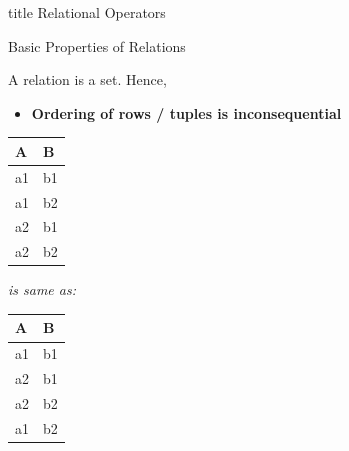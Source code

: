 \documentclass[aspectratio=169, xcolor=dvipsnames]{beamer}
\begin{document}
\begin{frame}
  \vfill
  \centering
  \begin{beamercolorbox}[sep=8pt,center,shadow=true,rounded=true]{title}
    Relational Operators\par%
  \end{beamercolorbox}
  \vfill
\end{frame}

\begin{frame}{Basic Properties of Relations}
    \begin{block}{A relation is a set. Hence,}
        \begin{itemize}[<+->]
            \item \textbf{Ordering of rows / tuples is inconsequential}
        \end{itemize}
        \begin{center}
            \begin{tabular}{|l|l|}
            \hline
            \textbf{A} & \textbf{B} \\ \hline
            a1 & b1 \\ \hline
            a1 & b2 \\ \hline
            a2 & b1 \\ \hline
            a2 & b2 \\ \hline
            \end{tabular}
            \quad \textit{is same as:} \quad
            \begin{tabular}{|l|l|}
            \hline
            \textbf{A} & \textbf{B} \\ \hline
            a1 & b1 \\ \hline
            a2 & b1 \\ \hline
            a2 & b2 \\ \hline
            a1 & b2 \\ \hline
            \end{tabular}
        \end{center}
    \end{block}
    
\end{frame}
\end{document}
